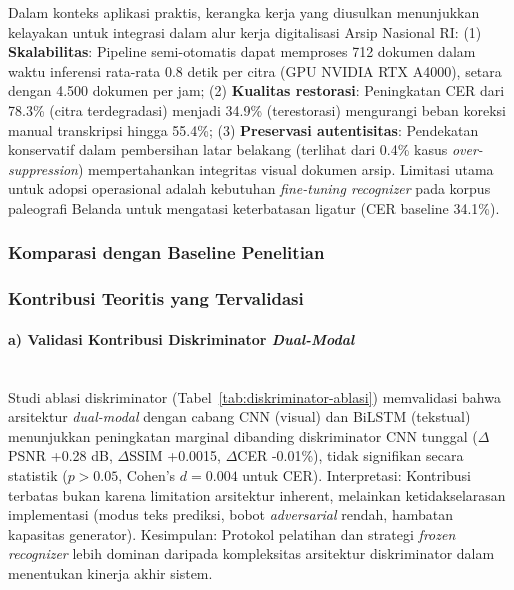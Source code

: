 \documentclass[12pt,a4paper]{article}
\begin{document}
Dalam konteks aplikasi praktis, kerangka kerja yang diusulkan menunjukkan kelayakan untuk integrasi dalam alur kerja digitalisasi Arsip Nasional RI: (1) \textbf{Skalabilitas}: Pipeline semi-otomatis dapat memproses 712 dokumen dalam waktu inferensi rata-rata 0.8 detik per citra (GPU NVIDIA RTX A4000), setara dengan 4.500 dokumen per jam; (2) \textbf{Kualitas restorasi}: Peningkatan CER dari 78.3\% (citra terdegradasi) menjadi 34.9\% (terestorasi) mengurangi beban koreksi manual transkripsi hingga 55.4\%; (3) \textbf{Preservasi autentisitas}: Pendekatan konservatif dalam pembersihan latar belakang (terlihat dari 0.4\% kasus \textit{over-suppression}) mempertahankan integritas visual dokumen arsip. Limitasi utama untuk adopsi operasional adalah kebutuhan \textit{fine-tuning recognizer} pada korpus paleografi Belanda untuk mengatasi keterbatasan ligatur (CER baseline 34.1\%).

\vspace{0.8em}

\subsubsection{Komparasi dengan Baseline Penelitian}
\label{subsec:validasi-kebaruan}
\vspace{0.8em}

\subsubsection{Kontribusi Teoritis yang Tervalidasi}
\label{subsubsec:kontribusi-teoritis-tervalidasi}

\paragraph{a) Validasi Kontribusi Diskriminator \textit{Dual-Modal}}\mbox{}\\[0.1em]

Studi ablasi diskriminator (Tabel~\ref{tab:diskriminator-ablasi}) memvalidasi bahwa arsitektur \textit{dual-modal} dengan cabang CNN (visual) dan BiLSTM (tekstual) menunjukkan peningkatan marginal dibanding diskriminator CNN tunggal ($\Delta$PSNR +0.28 dB, $\Delta$SSIM +0.0015, $\Delta$CER -0.01\%), tidak signifikan secara statistik ($p>0.05$, Cohen's $d=0.004$ untuk CER). Interpretasi: Kontribusi terbatas bukan karena limitation arsitektur inherent, melainkan ketidakselarasan implementasi (modus teks prediksi, bobot \textit{adversarial} rendah, hambatan kapasitas generator). Kesimpulan: Protokol pelatihan dan strategi \textit{frozen recognizer} lebih dominan daripada kompleksitas arsitektur diskriminator dalam menentukan kinerja akhir sistem.
\end{document}
